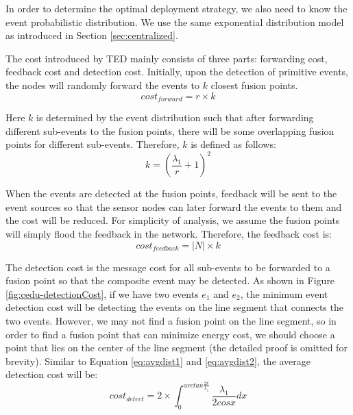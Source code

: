 In order to determine the optimal deployment strategy, we also need to know the event probabilistic distribution. We use the same exponential distribution model as introduced in Section \ref{sec:centralized}. %

The cost introduced by TED mainly consists of three parts: forwarding cost, feedback cost and detection cost. Initially, upon the detection of primitive events, the nodes will randomly forward the events to \(k\) closest fusion points. 
\begin{displaymath}
cost_{forward}=r\times k
\end{displaymath}

Here \(k\) is determined by the event distribution such that after forwarding different sub-events to the fusion points, there will be some overlapping fusion points for different sub-events. Therefore, \(k\) is defined as follows:
\begin{equation}
k=(\frac{{\lambda}_1}{r}+1)^2\label{eq:forwardNum}
\end{equation}

When the events are detected at the fusion points, feedback will be sent to the event sources so that the sensor nodes can later forward the events to them and the cost will be reduced. For simplicity of analysis, we assume the fusion points will simply flood the feedback in the network. Therefore, the feedback cost is:
\begin{displaymath}
cost_{feedback}=|N|\times k
\end{displaymath}

The detection cost is the message cost for all sub-events to be forwarded to a fusion point so that the composite event may be detected. As shown in Figure \ref{fig:cedu-detectionCost}, if we have two events \(e_1\) and \(e_2\), the minimum event detection cost will be detecting the events on the line segment that connects the two events. However, we may not find a fusion point on the line segment, so in order to find a fusion point that can minimize energy cost, we should choose a point that lies on the center of the line segment (the detailed proof is omitted for brevity). Similar to Equation \ref{eq:avgdist1} and \ref{eq:avgdist2}, the average detection cost will be:
\begin{displaymath}
cost_{detect}=2\times \int_0^{arctan\frac{2r}{{\lambda}_1}}\frac{{\lambda}_1}{2cosx}dx
\end{displaymath}

